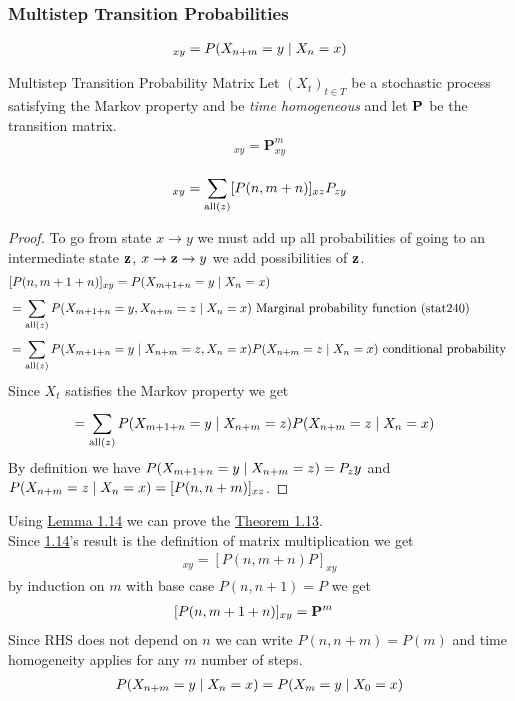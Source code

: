 \documentclass[12pt,a4paper]{article}
\begin{document}
\subsubsection{Multistep Transition Probabilities}
\begin{defn}
\begin{align*}
[P(n, n+m)]_{xy} = P(X_{n+m} = y \given X_{n} = x)
\end{align*}
\end{defn}

\begin{thm}{Multistep Transition Probability Matrix}
\label{thm113}
Let $(X_t)_{t\in T}$ be a stochastic process satisfying the Markov property and be \textit{time homogeneous} and let $\bf P$ be the transition matrix.  
\begin{align*}
[P(n, n+m)]_{xy} = \mathbf{P}^m_{xy}
\end{align*}
\end{thm}
\begin{lemma}{}
\label{lem114}
\begin{align*}
[P(n, m+1+n)]_{xy} = \nsum{\mathrm{all}(z)}{}[P(n,m+n)]_{xz}P_{zy}
\end{align*}
\end{lemma}
\begin{proof}
To go from state $x \to y$ we must add up all probabilities of going to an intermediate state $\bf z$, $x \to {\bf z} \to y$ we add possibilities of $\bf z$. 
\begin{align*}
&[P(n, m+1+n)]_{xy} = P(X_{m+1+n} = y \;\vert\; X_{n} = x)\\
&= \sum\limits_{\mathrm{all}(z)}^{} P(X_{m+1+n} = y, X_{n+m} = z \;\vert\; X_{n} = x) \text{ Marginal probability function (stat240) }\\
&= \sum\limits_{\mathrm{all}(z)}^{} P(X_{m+1+n} = y \;\vert\; X_{n+m} = z , X_{n} = x)P(X_{n+m} = z \;\vert\; X_n = x) \text{ conditional probability }
\end{align*}
Since $X_t$ satisfies the Markov property we get
\begin{align*}
&= \sum\limits_{\mathrm{all}(z)}^{} P(X_{m+1+n} = y \;\vert\; X_{n+m} = z)P(X_{n+m} = z \;\vert\; X_n = x)
\end{align*}
By definition we have $P(X_{m+1+n} = y \;\vert\; X_{n+m} = z) = P_zy$ and $P(X_{n+m} = z \;\vert\; X_n = x) = [P(n, n+m)]_{xz}$. 
\end{proof}
Using \hyperref[lem114]{Lemma 1.14} we can prove the \hyperref[thm113]{Theorem 1.13}. \\
Since  \hyperref[lem114]{1.14}'s result is the definition of matrix multiplication we get
\begin{align*}
[P(n, m+1+n)]_{xy} = [P(n, m+n)P]_{xy}
\end{align*}
by induction on $m$ with base case $P(n, n+1) = P$ we get
\begin{align*}
&[P(n, m+1+n)]_{xy} = {\bf P}^m
\end{align*}
Since RHS does not depend on $n$ we can write $P(n, n+m) = P(m)$ and time homogeneity applies for any $m$ number of steps. 
\begin{align*}
P(X_{n+m} = y \;\vert\; X_n = x) = P(X_{m} = y \;\vert\; X_0 = x)
\end{align*}  
\end{document}

